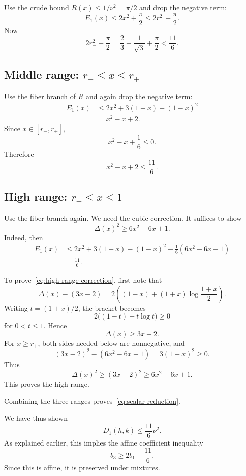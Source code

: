Use the crude bound $R(x)\le 1/\nu^2=\pi/2$ and drop the negative term:
\[
        E_1(x)\le 2x^2+\frac\pi2
        \le 2r_-^2+\frac\pi2.
\]
Now
\[
        2r_-^2+\frac\pi2
        =\frac23-\frac1{\sqrt3}+\frac\pi2
        <\frac{11}{6}.
\]

\subsection*{Middle range: $r_-\le x\le r_+$}

Use the fiber branch of $R$ and again drop the negative term:
\begin{align*}
        E_1(x)
        &\le 2x^2+3(1-x)-(1-x)^2\\
        &=x^2-x+2.
\end{align*}
Since $x\in[r_-,r_+]$,
\[
        x^2-x+\frac16\le0.
\]
Therefore
\[
        x^2-x+2\le \frac{11}{6}.
\]

\subsection*{High range: $r_+\le x\le1$}

Use the fiber branch again. We need the cubic correction.
It suffices to show
\begin{equation}
        \Delta(x)^2\ge 6x^2-6x+1.
        \label{eq:high-range-correction}
\end{equation}
Indeed, then
\begin{align*}
        E_1(x)
        &\le 2x^2+3(1-x)-(1-x)^2-\frac16(6x^2-6x+1)\\
        &=\frac{11}{6}.
\end{align*}

To prove~\eqref{eq:high-range-correction}, first note that
\[
        \Delta(x)-(3x-2)
        =2\left((1-x)+(1+x)\log\frac{1+x}{2}\right).
\]
Writing $t=(1+x)/2$, the bracket becomes
\[
        2\bigl((1-t)+t\log t\bigr)\ge0
\]
for $0<t\le1$. Hence
\[
        \Delta(x)\ge 3x-2.
\]
For $x\ge r_+$, both sides needed below are nonnegative, and
\[
        (3x-2)^2-(6x^2-6x+1)=3(1-x)^2\ge0.
\]
Thus
\[
        \Delta(x)^2\ge (3x-2)^2\ge 6x^2-6x+1.
\]
This proves the high range.

Combining the three ranges proves~\eqref{eq:scalar-reduction}.

We have thus shown
\[
        D_1(h,k)\le \frac{11}{6}\nu^2.
\]
As explained earlier, this implies the affine coefficient inequality
\[
        b_3\ge 2b_1-\frac{11}{6}.
\]
Since this is affine, it is preserved under mixtures.

